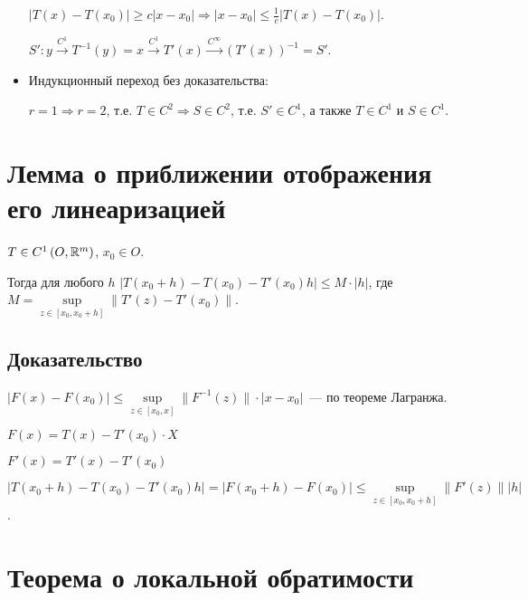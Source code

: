 \documentclass{article}
\begin{document}
\begin{itemize}
                    $\left| T(x) - T(x_0) \right| \geq c | x - x_0 | \Rightarrow | x - x_0 | \leq \frac{1}{c} \left| T(x) - T(x_0) \right|$.
                    
                    $S' : y \xrightarrow{C^1} T^{-1} (y) = x \xrightarrow{C^1} T'(x) \xrightarrow{C^{\infty}} \left(T'(x)\right)^{-1} = S'$.
                    
                \item Индукционный переход без доказательства:
                
                    $r = 1 \Rightarrow r = 2$, т.е. $T \in C^2 \Rightarrow S \in C^2$, т.е. $S' \in C^1$, а также $T \in C^1$ и $S \in C^1$.
                    
            \end{itemize}
            
    \newpage
    
    \section{Лемма о приближении отображения его линеаризацией}
    
        $T \in C^1 \left( O, \mathbb{R}^m \right)$, $x_0 \in O$.
        
        Тогда для любого $h$ $\left| T(x_0 + h) - T(x_0) - T'(x_0) h \right| \leq M \cdot |h|$, где $M = \sup\limits_{z \in [x_0, x_0 + h]} \| T'(z) - T'(x_0) \|$.
        
        \subsection{Доказательство}
        
            $\left| F(x) - F(x_0) \right| \leq \sup\limits_{z \in [x_0, x]} \| F^{-1} (z) \| \cdot | x - x_0 |$~--- по теореме Лагранжа.
            
            $F(x) = T(x) - T'(x_0) \cdot X$
            
            $F'(x) = T'(x) - T'(x_0)$
            
            $\left| T(x_0 + h) - T(x_0) - T'(x_0) h \right| = \left| F(x_0 + h) - F(x_0) \right| \leq \sup\limits_{z \in [x_0, x_0 + h]} \| F'(z) \| |h|$.
            
    \newpage
    
    \section{Теорема о локальной обратимости}
    
\end{document}
